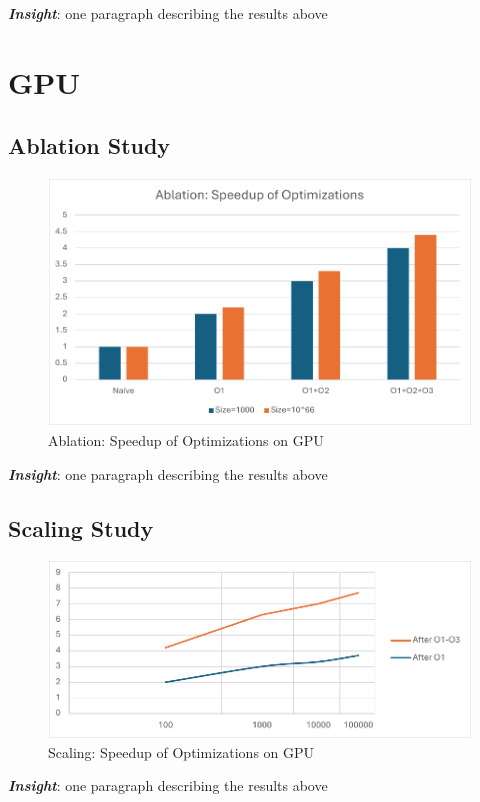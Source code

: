 \documentclass[10pt]{article}
\begin{document}
\textbf{\textit{Insight}}: one paragraph describing the results above

\section{GPU}

\subsection{Ablation Study}

\begin{figure}[h]
\centering
\includegraphics[width=0.7\linewidth]{assets/ablation_gpu.pdf}
\caption{Ablation: Speedup of Optimizations on GPU}
\label{fig:gpu_ablation}
\end{figure}

\textbf{\textit{Insight}}: one paragraph describing the results above

\subsection{Scaling Study}

\begin{figure}[h]
\centering
\includegraphics[width=0.7\linewidth]{assets/scaling_gpu.pdf}
\caption{Scaling: Speedup of Optimizations on GPU}
\label{fig:gpu_scaling}
\end{figure}

\textbf{\textit{Insight}}: one paragraph describing the results above
\end{document}

